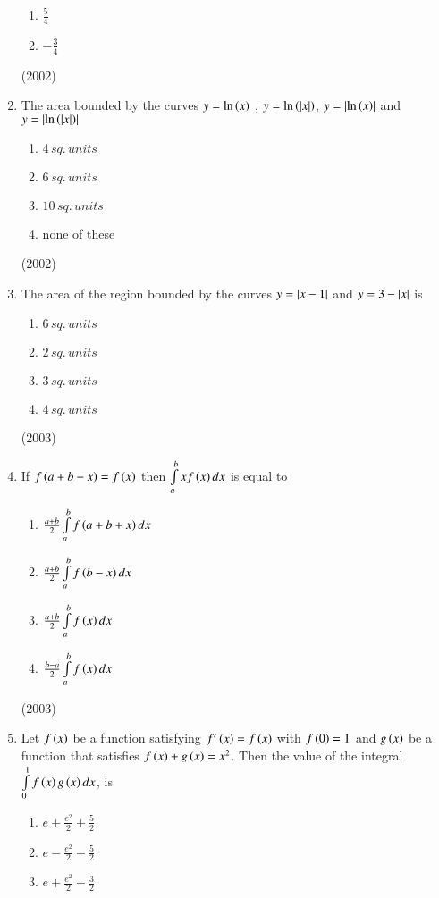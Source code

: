 \documentclass[journal]{IEEEtran}
\begin{document}
\begin{enumerate}
\begin{enumerate}
				\item $\frac{5}{4}$
				\item $-\frac{3}{4}$
			\end{enumerate}
			\hfill (2002)
	\item
		The area bounded by the curves $y= \ln \left(x\right)$ , $y= \ln \left(\left\vert x\right\vert\right)$, $y=\left\vert\ln\left(x\right)\right\vert$ and $y=\left\vert\ln \left(\left\vert x\right\vert\right)\right\vert$
			\begin{enumerate}
					\item $4 \, sq. \, units$
					\item $6 \, sq. \, units$
					\item $10 \, sq. \, units$
					\item none of these
			\end{enumerate}
			\hfill(2002)
	\item
		The area of the region bounded by the curves $y= \left\vert x-1\right\vert$ and $y=3-\left\vert x\right\vert$ is
			\begin {enumerate}
				\item $6 \, sq. \, units$
				\item $2 \, sq. \, units$
				\item $3 \, sq. \, units$
				\item $4 \, sq. \, units$
			\end {enumerate}
			\hfill (2003)
	\item
		If $f\left(a+b-x\right)=f\left(x\right)$ then $\int \limits_a^b xf\left(x\right)dx$ is equal to
			\begin {enumerate}
				\itemsep0.3em
				\item $\frac{a+b}{2} \int \limits_a^b f\left(a+b+x\right)dx$
				\item $\frac{a+b}{2} \int \limits_a^b f\left(b-x\right)dx$
				\item $\frac{a+b}{2} \int \limits_a^b f\left(x\right)dx$
				\item $\frac{b-a}{2} \int \limits_a^b f\left(x\right)dx$
			\end {enumerate}
			\hfill (2003)
	\item 
		Let $f\left(x\right)$ be a function satisfying $f^{\prime}\left(x\right) = f\left(x\right)$ with $f\left(0\right)=1$ and $g\left(x\right)$ be a function that satisfies $f\left(x\right) + g\left(x\right)=x^2$. Then the value of the integral $\int \limits_0^1 f\left(x\right)g\left(x\right)dx$, is
			\begin {enumerate}
				\itemsep0.4em
				\item $e+ \frac{e^2}{2} + \frac{5}{2}$
				\item $e- \frac{e^2}{2} - \frac{5}{2}$
				\item $e+ \frac{e^2}{2} - \frac{3}{2}$

\end{enumerate}
\end{enumerate}
\end{document}
